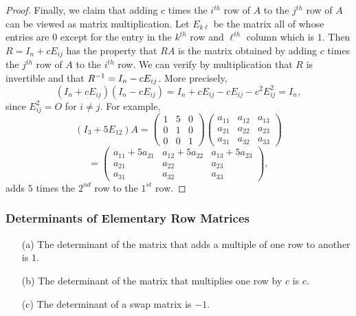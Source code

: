 \documentclass{ximera}
\begin{document}
\begin{proof}
Finally, we claim that adding $c$ times the $i^{th}$ row of $A$
to the $j^{th}$ row of $A$ can be viewed as matrix
multiplication.  Let $E_{k\ell}$ be the matrix all of whose
entries are $0$ except for the entry in the $k^{th}$ row and
$\ell^{th}$ column which is $1$.  Then $R=I_n+cE_{ij}$ has the
property that $RA$ is the matrix obtained by adding $c$ times
the $j^{th}$ row of $A$ to the $i^{th}$ row.  We can verify by
multiplication that $R$ is invertible and that
$R^{-1}=I_n-cE_{ij}$.  More precisely,
\[
(I_n+cE_{ij})(I_n-cE_{ij})=I_n+cE_{ij}-cE_{ij}-c^2E_{ij}^2=I_n,
\]
since $E_{ij}^2 = O$ for $i\not= j$.  For example,
\[
(I_3 + 5E_{12})A  =  \left(\begin{array}{ccc} 1 & 5 & 0\\ 0 & 1 & 0 \\ 0 & 0 & 1\end{array}\right)
\left(\begin{array}{ccc} a_{11} & a_{12} & a_{13}\\ a_{21} & a_{22} & a_{23}
 \\ a_{31} & a_{32} & a_{33} \end{array}\right) 
 \]
 \[
=\left(\begin{array}{ccc} a_{11}+5a_{21} & a_{12}+5a_{22} & a_{13}+5a_{23} \\ 
a_{21} & a_{22} & a_{23} \\ a_{31} & a_{32} & a_{33} \end{array}\right),
\]
adds $5$ times the $2^{nd}$ row to the $1^{st}$ row.   \end{proof}

\subsubsection*{Determinants of Elementary Row Matrices}

\begin{lemma}  \label{L:detelemrowmat}
\begin{itemize}
\item[(a)] The determinant of the matrix that adds a multiple
of one row to another is $1$.
\item[(b)] The determinant of the matrix that multiplies one
row by $c$ is $c$.
\item[(c)] The determinant of a swap matrix is $-1$.
\end{itemize}
\end{lemma}  
 
\end{document}
